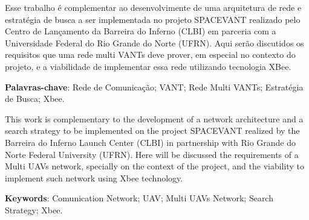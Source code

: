

Esse trabalho é complementar ao desenvolvimente de uma arquitetura de rede e estratégia de busca a ser implementada no projeto SPACEVANT realizado pelo Centro de Lançamento da Barreira do Inferno (CLBI) em parceria com a Universidade Federal do Rio Grande do Norte (UFRN). Aqui serão discutidos os requisitos que uma rede multi VANTs deve prover, em especial no contexto do projeto, e a viabilidade de implementar essa rede utilizando tecnologia XBee.
 
\textbf{Palavras-chave}: Rede de Comunicação; VANT; Rede Multi VANTs; Estratégia de Busca; Xbee.


This work is complementary to the development of a network architecture and a search strategy to be implemented on the project SPACEVANT realized by the Barreira do Inferno Launch Center (CLBI) in partnership with Rio Grande do Norte Federal University (UFRN). Here will be discussed the requirements of a Multi UAVs network, specially on the context of the project, and the viability to implement such network using Xbee technology.


\textbf{Keywords}: Comunication Network; UAV; Multi UAVs Network; Search Strategy; Xbee.